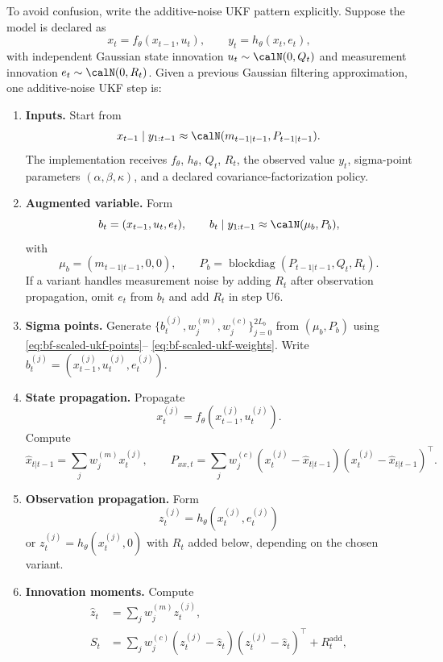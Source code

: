 To avoid confusion, write the additive-noise UKF pattern explicitly.  Suppose
the model is declared as
\begin{equation}
  x_t = f_\theta(x_{t-1},u_t),
  \qquad
  y_t = h_\theta(x_t,e_t),
\end{equation}
with independent Gaussian state innovation $u_t\sim\calN(0,Q_t)$ and
measurement innovation $e_t\sim\calN(0,R_t)$.  Given a previous Gaussian
filtering approximation, one additive-noise UKF step is:
\begin{enumerate}[label=\textbf{U\arabic*.}]
  \item \textbf{Inputs.}  Start from
    \[
      x_{t-1}\mid y_{1:t-1} \approx \calN(m_{t-1|t-1},P_{t-1|t-1}).
    \]
    The implementation receives $f_\theta$, $h_\theta$, $Q_t$, $R_t$, the
    observed value $y_t$, sigma-point parameters
    $(\alpha,\beta,\kappa)$, and a declared covariance-factorization policy.
  \item \textbf{Augmented variable.}  Form
    \[
      b_t=(x_{t-1},u_t,e_t),
      \qquad
      b_t\mid y_{1:t-1}\approx \calN(\mu_b,P_b),
    \]
    with
    \[
      \mu_b=(m_{t-1|t-1},0,0),\qquad
      P_b=\operatorname{blockdiag}(P_{t-1|t-1},Q_t,R_t).
    \]
    If a variant handles measurement noise by adding $R_t$ after observation
    propagation, omit $e_t$ from $b_t$ and add $R_t$ in step U6.
  \item \textbf{Sigma points.}  Generate
    $\{b_t^{(j)},w_j^{(m)},w_j^{(c)}\}_{j=0}^{2L_b}$ from
    $(\mu_b,P_b)$ using \eqref{eq:bf-scaled-ukf-points}--%
    \eqref{eq:bf-scaled-ukf-weights}.  Write
    $b_t^{(j)}=(x_{t-1}^{(j)},u_t^{(j)},e_t^{(j)})$.
  \item \textbf{State propagation.}  Propagate
    \[
      x_t^{(j)}=f_\theta(x_{t-1}^{(j)},u_t^{(j)}).
    \]
    Compute
    \[
      \hat x_{t|t-1}=\sum_j w_j^{(m)}x_t^{(j)},\qquad
      P_{xx,t}=\sum_j w_j^{(c)}
      (x_t^{(j)}-\hat x_{t|t-1})(x_t^{(j)}-\hat x_{t|t-1})^\top .
    \]
  \item \textbf{Observation propagation.}  Form
    \[
      z_t^{(j)}=h_\theta(x_t^{(j)},e_t^{(j)})
    \]
    or $z_t^{(j)}=h_\theta(x_t^{(j)},0)$ with $R_t$ added below, depending on
    the chosen variant.
  \item \textbf{Innovation moments.}  Compute
    \begin{align}
      \hat z_t &= \sum_j w_j^{(m)}z_t^{(j)},\\
      S_t &=
        \sum_j w_j^{(c)}(z_t^{(j)}-\hat z_t)(z_t^{(j)}-\hat z_t)^\top
        + R_t^{\mathrm{add}},\\

\end{align}
\end{enumerate}
